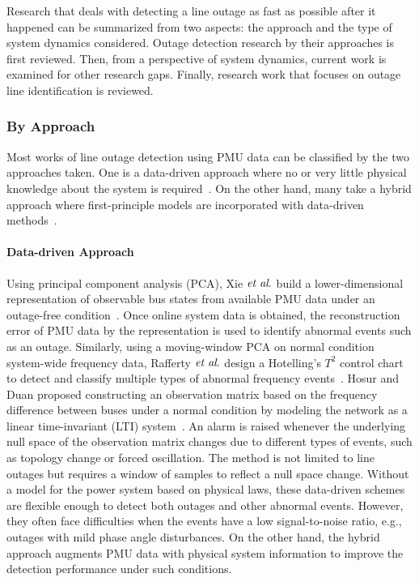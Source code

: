 Research that deals with detecting a line outage as fast as possible after it happened can be summarized from two aspects: the approach and the type of system dynamics considered. Outage detection research by their approaches is first reviewed. Then, from a perspective of system dynamics, current work is examined for other research gaps. Finally, research work that focuses on outage line identification is reviewed.

\subsubsection{By Approach} %
\label{ssub:by_approach}

Most works of line outage detection using PMU data can be classified by the two approaches taken. One is a data-driven approach where no or very little physical knowledge about the system is required~\cite{Xie2014, Rafferty2016, Hosur2019}. On the other hand, many take a hybrid approach where first-principle models are incorporated with data-driven methods~\cite{Jamei2016, Jamei2017a, ardakanian2017event, Ardakanian2019a, Tate2008, tate2009double, dai2020line,Chen2016, Rovatsos2017}. 

\paragraph{Data-driven Approach}
Using principal component analysis (PCA), Xie $\textit{et al}.$ build a lower-dimensional representation of observable bus states from available PMU data under an outage-free condition~\cite{Xie2014}. Once online system data is obtained, the reconstruction error of PMU data by the representation is used to identify abnormal events such as an outage. 
Similarly, using a moving-window PCA on normal condition system-wide frequency data, Rafferty $\textit{et al}.$ design a Hotelling’s $T^2$ control chart to detect and classify multiple types of abnormal frequency events~\cite{Rafferty2016}. 
Hosur and Duan proposed constructing an observation matrix based on the frequency difference between buses under a normal condition by modeling the network as a linear time-invariant (LTI) system~\cite{Hosur2019}. An alarm is raised whenever the underlying null space of the observation matrix changes due to different types of events, such as topology change or forced oscillation. The method is not limited to line outages but requires a window of samples to reflect a null space change. Without a model for the power system based on physical laws, these data-driven schemes are flexible enough to detect both outages and other abnormal events. However, they often face difficulties when the events have a low signal-to-noise ratio, e.g., outages with mild phase angle disturbances. On the other hand, the hybrid approach augments PMU data with physical system information to improve the detection performance under such conditions.

